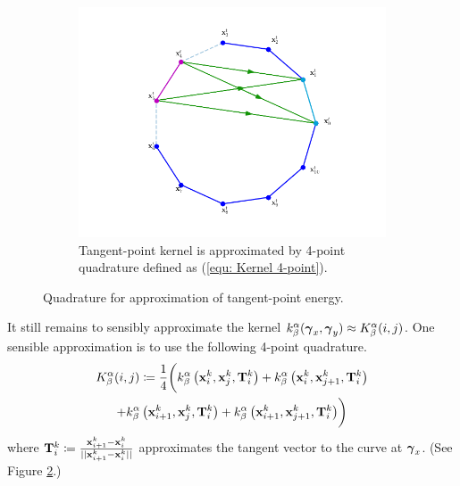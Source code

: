 \documentclass[../dissertation.tex]{subfiles}
\begin{document}
\begin{figure}[tbp]
\begin{subfigure}[b]{0.75\textwidth}
        \includegraphics[width=\textwidth]{sections/unknottingCurveImgs/energyDiscretization2}
        \caption{Tangent-point kernel is approximated by 4-point quadrature defined as (\ref{equ: Kernel 4-point}).}
        \label{fig: Tangent-point kernel approximation}
    \end{subfigure}
    \caption{Quadrature for approximation of tangent-point energy.}
\end{figure}

It still remains to sensibly approximate the kernel $k_{\beta}^{\alpha} (\boldsymbol{\gamma}_x, \boldsymbol{\gamma}_y) \approx K_{\beta}^{\alpha} (i, j)$.
One sensible approximation is to use the following 4-point quadrature\cite{YSC2021}.
\begin{multline}
    K_{\beta}^{\alpha} (i, j) \coloneqq \frac{1}{4} \biggl( k_{\beta}^{\alpha} \left( \mathbf{x}_i^k, \mathbf{x}_j^k, \mathbf{T}_i^k \right)
        + k_{\beta}^{\alpha} \left( \mathbf{x}_i^k, \mathbf{x}_{j+1}^k, \mathbf{T}_i^k \right) \\
        + k_{\beta}^{\alpha} \left( \mathbf{x}_{i+1}^k, \mathbf{x}_j^k, \mathbf{T}_i^k \right)
        + k_{\beta}^{\alpha} \left( \mathbf{x}_{i+1}^k, \mathbf{x}_{j+1}^k, \mathbf{T}_i^k \right)
    \biggr)
    \label{equ: Kernel 4-point}
\end{multline}
where $\mathbf{T}_{i}^k \coloneqq \frac{\mathbf{x}_{i+1}^k - \mathbf{x}_i^k}{\lvert \lvert \mathbf{x}_{i+1}^k - \mathbf{x}_i^k \rvert \rvert}$ approximates the tangent vector to the curve at $\boldsymbol{\gamma}_x$.
(See Figure \ref{fig: Tangent-point kernel approximation}.)
\end{document}
